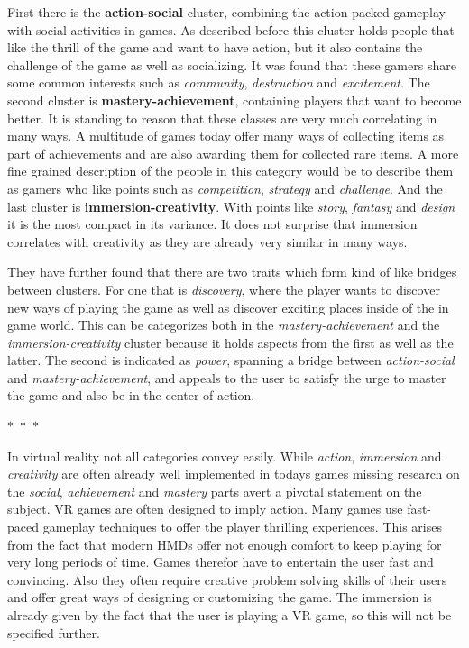 First there is the \textbf{action-social} cluster, combining the action-packed gameplay with social activities in games. As described before this cluster holds people that like the thrill of the game and want to have action, but it also contains the challenge of the game as well as socializing. It was found that these gamers share some common interests such as \textit{community}, \textit{destruction} and \textit{excitement}. \newline
The second cluster is \textbf{mastery-achievement}, containing players that want to become better. It is standing to reason that these classes are very much correlating in many ways. A multitude of games today offer many ways of collecting items as part of achievements and are also awarding them for collected rare items. A more fine grained description of the people in this category would be to describe them as gamers who like points such as \textit{competition}, \textit{strategy} and \textit{challenge}. \newline
And the last cluster is \textbf{immersion-creativity}. With points like \textit{story}, \textit{fantasy} and \textit{design} it is the most compact in its variance. It does not surprise that immersion correlates with creativity as they are already very similar in many ways. 

They have further found that there are two traits which form kind of like bridges between clusters. \newline
For one that is \textit{discovery}, where the player wants to discover new ways of playing the game as well as discover exciting places inside of the in game world. This can be categorizes both in the \textit{mastery-achievement} and the \textit{immersion-creativity} cluster because it holds aspects from the first as well as the latter.\newline 
The second is indicated as \textit{power}, spanning a bridge between \textit{action-social} and \textit{mastery-achievement}, and appeals to the user to satisfy the urge to master the game and also be in the center of action. 

\begin{center}
	\small
	$\ast$~$\ast$~$\ast$
\end{center}

In virtual reality not all categories convey easily. While \textit{action}, \textit{immersion} and \textit{creativity} are often already well implemented in todays games missing research on the \textit{social}, \textit{achievement} and \textit{mastery} parts avert a pivotal statement on the subject. \newline
VR games are often designed to imply action. Many games use fast-paced gameplay techniques to offer the player thrilling experiences. This arises from the fact that modern HMDs offer not enough comfort to keep playing for very long periods of time. Games therefor have to entertain the user fast and convincing. Also they often require creative problem solving skills of their users and offer great ways of designing or customizing the game.\newline
The immersion is already given by the fact that the user is playing a VR game, so this will not be specified further. 

